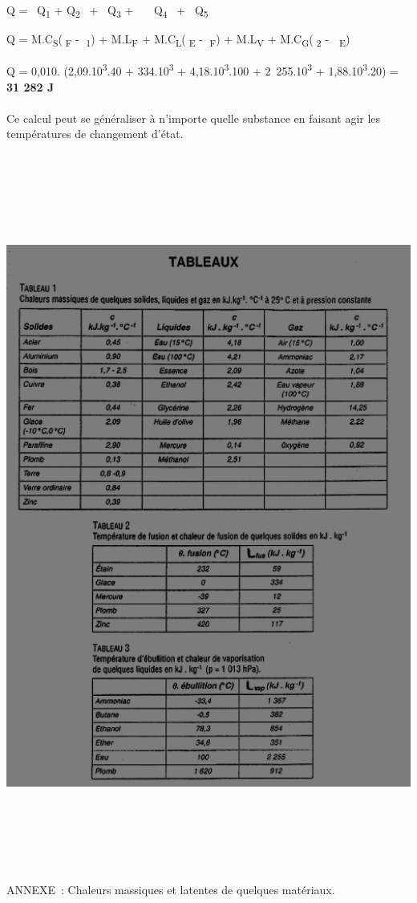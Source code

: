 Q =~ Q\textsubscript{1} + Q\textsubscript{2}~ +~ Q\textsubscript{3 }+~~~
Q\textsubscript{4}~ +~ Q\textsubscript{5}

Q = M.C\textsubscript{S}(\textsubscript{F} - \textsubscript{1}) +
M.L\textsubscript{F} + M.C\textsubscript{L}(\textsubscript{E} -
\textsubscript{F}) + M.L\textsubscript{V} +
M.C\textsubscript{G}(\textsubscript{2} -  \textsubscript{E})

Q = 0,010. (2,09.10\textsuperscript{3}.40 + 334.10\textsuperscript{3} +
4,18.10\textsuperscript{3}.100 + 2~255.10\textsuperscript{3} +
1,88.10\textsuperscript{3}.20) = \textbf{31 282 J}\\
~\\
Ce calcul peut se généraliser à n'importe quelle substance en faisant
agir les températures de changement d'état.

\includegraphics[width=17.851cm,height=23.895cm]{Pictures/10000001000001EA000002916122DCB2747A02B4.png}ANNEXE~:
Chaleurs massiques et latentes de quelques matériaux.

